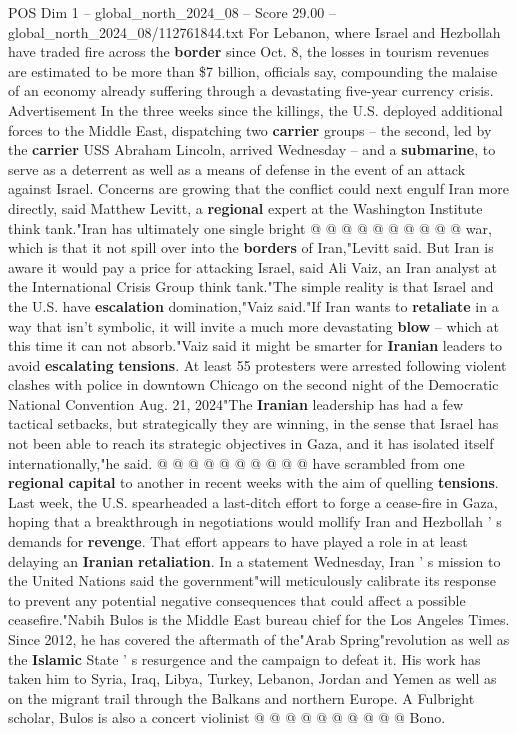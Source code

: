 \begin{textsample}{POS Dim 1 – global\_north\_2024\_08 – Score 29.00 – global\_north\_2024\_08/112761844.txt}
For Lebanon, where Israel and Hezbollah have traded fire across the \textbf{border} since Oct. 8, the losses in tourism revenues are estimated to be more than \$7 billion, officials say, compounding the malaise of an economy already suffering through a devastating five-year currency crisis.
Advertisement In the three weeks since the killings, the U.S. deployed additional forces to the Middle East, dispatching two \textbf{carrier} groups -- the second, led by the \textbf{carrier} USS Abraham Lincoln, arrived Wednesday -- and a \textbf{submarine}, to serve as a deterrent as well as a means of defense in the event of an attack against Israel.
Concerns are growing that the conflict could next engulf Iran more directly, said Matthew Levitt, a \textbf{regional} expert at the Washington Institute think tank."Iran has ultimately one single bright @ @ @ @ @ @ @ @ @ @ war, which is that it not spill over into the \textbf{borders} of Iran,"Levitt said.
But Iran is aware it would pay a price for attacking Israel, said Ali Vaiz, an Iran analyst at the International Crisis Group think tank."The simple reality is that Israel and the U.S. have \textbf{escalation} domination,"Vaiz said."If Iran wants to \textbf{retaliate} in a way that isn't symbolic, it will invite a much more devastating \textbf{blow} -- which at this time it can not absorb."Vaiz said it might be smarter for \textbf{Iranian} leaders to avoid \textbf{escalating} \textbf{tensions}.
At least 55 protesters were arrested following violent clashes with police in downtown Chicago on the second night of the Democratic National Convention Aug. 21, 2024"The \textbf{Iranian} leadership has had a few tactical setbacks, but strategically they are winning, in the sense that Israel has not been able to reach its strategic objectives in Gaza, and it has isolated itself internationally,"he said. @ @ @ @ @ @ @ @ @ @ have scrambled from one \textbf{regional} \textbf{capital} to another in recent weeks with the aim of quelling \textbf{tensions}.
Last week, the U.S. spearheaded a last-ditch effort to forge a cease-fire in Gaza, hoping that a breakthrough in negotiations would mollify Iran and Hezbollah ' s demands for \textbf{revenge}.
That effort appears to have played a role in at least delaying an \textbf{Iranian} \textbf{retaliation}.
In a statement Wednesday, Iran ' s mission to the United Nations said the government"will meticulously calibrate its response to prevent any potential negative consequences that could affect a possible ceasefire."Nabih Bulos is the Middle East bureau chief for the Los Angeles Times.
Since 2012, he has covered the aftermath of the"Arab Spring"revolution as well as the \textbf{Islamic} State ' s resurgence and the campaign to defeat it.
His work has taken him to Syria, Iraq, Libya, Turkey, Lebanon, Jordan and Yemen as well as on the migrant trail through the Balkans and northern Europe.
A Fulbright scholar, Bulos is also a concert violinist @ @ @ @ @ @ @ @ @ @ Bono.


\end{textsample}
